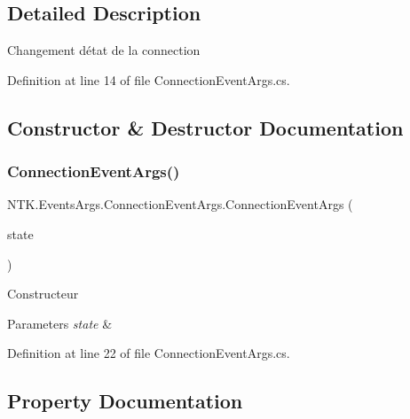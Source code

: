 \subsection{Detailed Description}
Changement d\textquotesingle{}état de la connection 



Definition at line 14 of file Connection\+Event\+Args.\+cs.



\subsection{Constructor \& Destructor Documentation}
\mbox{\label{class_n_t_k_1_1_events_args_1_1_connection_event_args_a1faf874b62f28a87396d93de0513f781}} 
\subsubsection{\texorpdfstring{ConnectionEventArgs()}{ConnectionEventArgs()}}
{\footnotesize\ttfamily N\+T\+K.\+Events\+Args.\+Connection\+Event\+Args.\+Connection\+Event\+Args (\begin{DoxyParamCaption}\item[{Connection\+State}]{state }\end{DoxyParamCaption})}



Constructeur 


\begin{DoxyParams}{Parameters}
{\em state} & \\
\hline
\end{DoxyParams}


Definition at line 22 of file Connection\+Event\+Args.\+cs.



\subsection{Property Documentation}
\mbox{\label{class_n_t_k_1_1_events_args_1_1_connection_event_args_a42e1cb564b6a60eac617698195bf6ea0}} 
